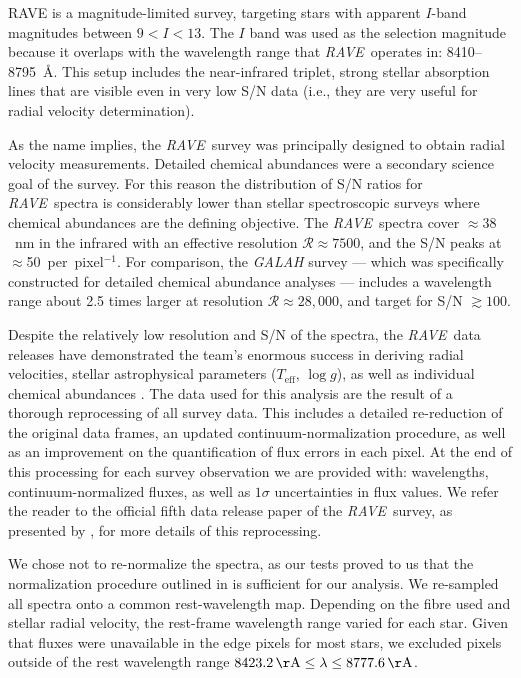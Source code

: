 \documentclass[preprint,trackchanges]{aastex}
\newcommand{\project}[1]{\textsl{#1}}
\newcommand{\acronym}[1]{{\small{#1}}}
\newcommand{\rave}{\project{\acronym{RAVE}}}
\newcommand{\logg}{\log g}
\newcommand{\teff}{T_{\mathrm{eff}}}
\begin{document}
RAVE is a magnitude-limited survey, targeting stars with apparent $I$-band
magnitudes between $9 < I < 13$.  The $I$ band was used as the selection
magnitude because it overlaps with the wavelength range that \rave\ operates in:
8410--8795~\AA.  This setup includes the  near-infrared triplet,
strong stellar absorption lines that are visible even in very low S/N data 
(i.e., they are very useful for radial velocity determination).  


As the name implies, the \rave\ survey was principally designed to obtain radial
velocity measurements.  Detailed chemical abundances were a secondary science 
goal of the survey.  For this reason the distribution of S/N ratios for \rave\ 
spectra is considerably lower than stellar spectroscopic surveys where chemical
abundances are the defining objective.  The 
\rave\ spectra cover $\approx38$~nm in the infrared with an effective resolution
$\mathcal{R} \approx 7500$, and the S/N peaks at $\approx$50~per~pixel$^{-1}$.
For comparison, the \project{GALAH} survey \citep{DeSilva_2015} --- which was 
specifically constructed for detailed chemical abundance analyses --- includes a
wavelength range about 2.5 times larger at resolution $\mathcal{R} \approx 28,000$,
and target for S/N $\gtrsim100$.


Despite the relatively low resolution and S/N of the spectra, the \rave\ data
releases have demonstrated the team's enormous success in deriving radial 
velocities, stellar astrophysical parameters ($\teff$, $\logg$), as well as 
individual chemical abundances \citep{Steinmetz_2006,Zwitter_2008,Siebert_2011,
Kordopatis_2013, Kunder_2016}.  The data used for this analysis are the result
of a thorough reprocessing of all survey data.  This includes a detailed
re-reduction of the original data frames, an updated continuum-normalization
procedure, as well as an improvement on the quantification of flux errors in
each pixel.  At the end of this processing for each survey observation we are 
provided with: wavelengths, continuum-normalized fluxes, as well as 
$1\sigma$ uncertainties in flux values.  We refer the reader to the official 
fifth data release paper of the \rave\ survey, as presented by
\citet{Kunder_2016}, for more details of this reprocessing.


We chose not to re-normalize the spectra, as our tests proved to us that the
normalization procedure outlined in \citet{Kunder_2016} is sufficient for our
analysis.  We re-sampled all spectra onto a common rest-wavelength map.
Depending on the fibre used and stellar radial velocity, the rest-frame wavelength
range varied for each star.  Given that fluxes were unavailable in the edge
pixels for most stars, we excluded pixels outside of the rest wavelength range
$8423.2\,{\rm \AA} \le \lambda \le 8777.6\,{\rm \AA}$.
\end{document}
